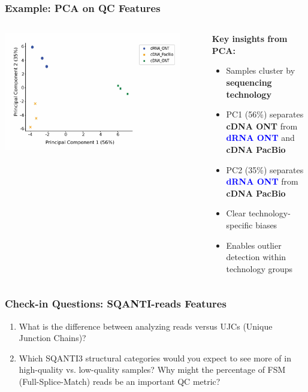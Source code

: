 \documentclass[aspectratio=169]{beamer}
\begin{document}
\begin{frame}
  \frametitle{Example: PCA on QC Features}
  \begin{columns}[T]
    \begin{column}{0.55\textwidth}
      \centering
      \includegraphics[width=0.9\textwidth]{figures/Genome Res_figure2_a.jpg}
    \end{column}
    \begin{column}{0.4\textwidth}
      \small
      \textbf{Key insights from PCA:}
      \begin{itemize}
        \item Samples cluster by \textbf{sequencing technology}
        \item PC1 (56\%) separates \textcolor{green!60!black}{\textbf{cDNA ONT}} from \textcolor{blue}{\textbf{dRNA ONT}} and \textcolor{longtrec-orange}{\textbf{cDNA PacBio}}
        \item PC2 (35\%) separates \textcolor{blue}{\textbf{dRNA ONT}} from \textcolor{longtrec-orange}{\textbf{cDNA PacBio}}
        \item Clear technology-specific biases
        \item Enables outlier detection within technology groups
      \end{itemize}
      
      \vspace{0.3cm}
      \scriptsize
    \end{column}
  \end{columns}
\end{frame}

\begin{frame}
  \frametitle{Check-in Questions: SQANTI-reads Features}
  \begin{enumerate}
    \item What is the difference between analyzing reads versus UJCs (Unique Junction Chains)?
    \vspace{0.5cm}
    \item Which SQANTI3 structural categories would you expect to see more of in high-quality vs. low-quality samples? Why might the percentage of FSM (Full-Splice-Match) reads be an important QC metric?
  \end{enumerate}
\end{frame}
\end{document}
